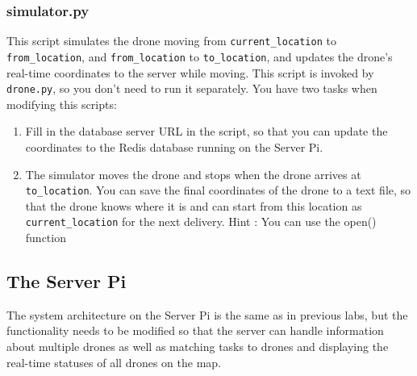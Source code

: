 \documentclass{article}
\begin{document}
\subsubsection{simulator.py}
This script simulates the drone moving from \verb!current_location! to \verb!from_location!, and \verb!from_location! to \verb!to_location!, and updates the drone's real-time coordinates to the server while moving. This script is invoked by \verb!drone.py!, so you don't need to run it separately. You have two tasks when modifying this scripts:
\begin{enumerate}
    \item Fill in the database server URL in the script, so that you can update the coordinates to the Redis database running on the Server Pi.
    \item\label{t2} The simulator moves the drone and stops when the drone arrives at \verb!to_location!. You can save the final coordinates of the drone to a text file, so that the drone knows where it is and can start from this location as \verb!current_location! for the next delivery. Hint : You can use the open() function \cite{open}
\end{enumerate}

\subsection{The Server Pi}
The system architecture on the Server Pi is the same as in previous labs, but the functionality needs to be modified so that the server can handle information about multiple drones as well as matching tasks to drones and displaying the real-time statuses of all drones on the map.
\end{document}
